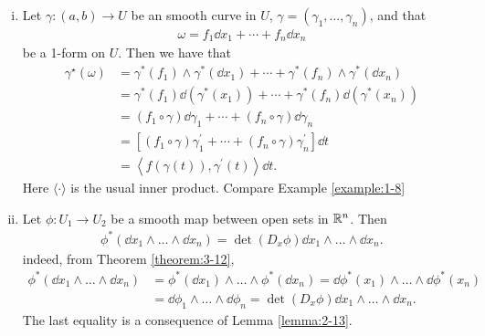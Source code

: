 \begin{example}\label{example:3-13}
\begin{enumerate}[(i)]
  \item Let $\gamma:(a, b)\to U$ be an smooth curve in $U$, $\gamma = (\gamma_1, \ldots, \gamma_n)$, and that 
    \begin{align*}
      \omega = f_1\dd x_1 + \cdots + f_n\dd x_n
    \end{align*}
    be a 1-form on $U$. Then we have that 
    \begin{align*}
      \gamma^{\star}(\omega)
      & = \gamma^{*}(f_{1})\wedge\gamma^{*}(\!\dd x_{1})+\cdots+\gamma^{*}(f_{n})\wedge\gamma^{*}(\!\dd x_{n})\\
      & = \gamma^{*}(f_{1})\dd(\gamma^{*}(x_{1}))+\cdots+\gamma^{*}(f_{n})\dd(\gamma^{*}(x_{n}))\\
      & = (f_{1}\circ\gamma)\dd\gamma_{1}+\cdots+(f_{n}\circ\gamma)\dd\gamma_{n}\\
      & = \left[(f_{1}\circ\gamma)\gamma_{1}^{\prime}+\cdots+(f_{n}\circ\gamma)\gamma_{n}^{\prime}\right]\dd t\\
      & = \left\langle f(\gamma(t)),\gamma^{\prime}(t)\right\rangle\!\dd t.
    \end{align*}
    Here $\langle\cdot\rangle$ is the usual inner product. Compare Example \ref{example:1-8}
  \item Let $\phi:U_1\to U_2$ be a smooth map between open sets in ${\mathbb{R}}^n$. Then
    \begin{align*}
      \phi^*(\!\dd x_1\wedge\ldots\wedge\dd x_n) = \det (D_x\phi)\dd x_1\wedge\ldots\wedge\dd x_n.
    \end{align*}
    indeed, from Theorem \ref{theorem:3-12},
    \begin{align*}
      \phi^{*}(\!\dd x_{1}\wedge\ldots\wedge \dd x_{n})
      & = \phi^*(\!\dd x_1)\wedge\ldots\wedge\phi^*(\!\dd x_n)
          = \dd\phi^*(x_1)\wedge\ldots\wedge \dd\phi^*(x_n)\\
      & = \dd\phi_1\wedge\ldots\wedge \dd\phi_n
          = \det{(D_{x}\phi)}\dd x_1\wedge\ldots\wedge \dd x_n.
    \end{align*}
    The last equality is a consequence of Lemma \ref{lemma:2-13}.
\end{enumerate}
\end{example}

